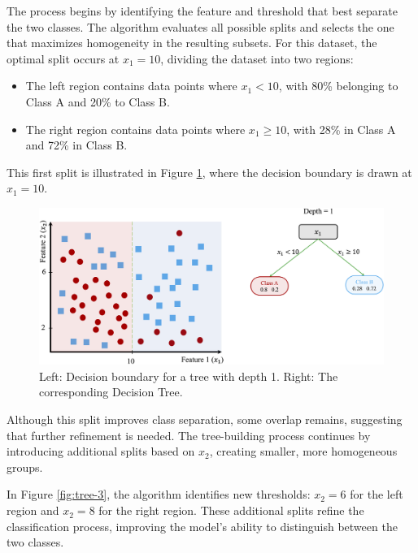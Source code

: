 \documentclass[
]{book}
\providecommand{\tightlist}{%
  \setlength{\itemsep}{0pt}\setlength{\parskip}{0pt}}
\theoremstyle{definition}
\theoremstyle{definition}
\theoremstyle{definition}
\theoremstyle{definition}
\theoremstyle{remark}
\begin{document}
The process begins by identifying the feature and threshold that best separate the two classes. The algorithm evaluates all possible splits and selects the one that maximizes homogeneity in the resulting subsets. For this dataset, the optimal split occurs at \(x_1 = 10\), dividing the dataset into two regions:

\begin{itemize}
\tightlist
\item
  The left region contains data points where \(x_1 < 10\), with 80\% belonging to Class A and 20\% to Class B.
\item
  The right region contains data points where \(x_1 \geq 10\), with 28\% in Class A and 72\% in Class B.
\end{itemize}

This first split is illustrated in Figure \ref{fig:tree-2}, where the decision boundary is drawn at \(x_1 = 10\).

\begin{figure}

{\centering \includegraphics[width=1\linewidth]{images/ch11_ex_tree_2} 

}

\caption{Left: Decision boundary for a tree with depth 1. Right: The corresponding Decision Tree.}\label{fig:tree-2}
\end{figure}

Although this split improves class separation, some overlap remains, suggesting that further refinement is needed. The tree-building process continues by introducing additional splits based on \(x_2\), creating smaller, more homogeneous groups.

In Figure \ref{fig:tree-3}, the algorithm identifies new thresholds: \(x_2 = 6\) for the left region and \(x_2 = 8\) for the right region. These additional splits refine the classification process, improving the model's ability to distinguish between the two classes.
\end{document}
